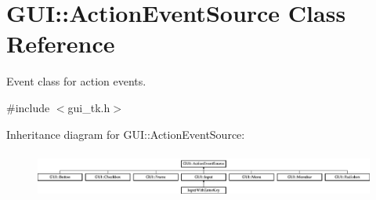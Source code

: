 \hypertarget{classGUI_1_1ActionEventSource}{\section{G\-U\-I\-:\-:Action\-Event\-Source Class Reference}
\label{classGUI_1_1ActionEventSource}
}


Event class for action events.  




{\ttfamily \#include $<$gui\-\_\-tk.\-h$>$}

Inheritance diagram for G\-U\-I\-:\-:Action\-Event\-Source\-:\begin{figure}[H]
\begin{center}
\leavevmode
\includegraphics[height=1.548387cm]{classGUI_1_1ActionEventSource}
\end{center}
\end{figure}
